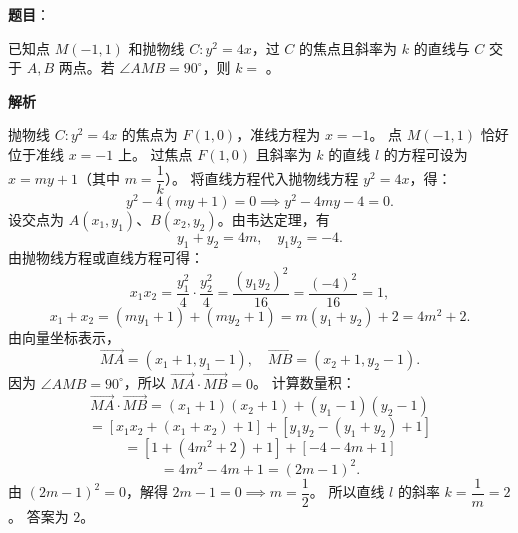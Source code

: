 \begin{answer}

\textbf{题目}：

已知点 $M(-1, 1)$ 和抛物线 $C: y^2 = 4x$，过 $C$ 的焦点且斜率为 $k$ 的直线与 $C$ 交于 $A, B$ 两点。若 $\angle AMB = 90^\circ$，则 $k =$ \underline{\hspace{2cm}}。

\textbf{解析}

抛物线 $C: y^2 = 4x$ 的焦点为 $F(1, 0)$，准线方程为 $x = -1$。
点 $M(-1, 1)$ 恰好位于准线 $x = -1$ 上。
过焦点 $F(1, 0)$ 且斜率为 $k$ 的直线 $l$ 的方程可设为 $x = my + 1$（其中 $m = \dfrac1k$）。
将直线方程代入抛物线方程 $y^2 = 4x$，得：
\nopagebreak[4]
\[y^2 - 4(my + 1) = 0 \implies y^2 - 4my - 4 = 0.\]
设交点为 $A(x_1, y_1)$、$B(x_2, y_2)$。由韦达定理，有
\nopagebreak[4]
\[y_1 + y_2 = 4m, \quad y_1 y_2 = -4.\]
由抛物线方程或直线方程可得：
\nopagebreak[4]
\[x_1 x_2 = \dfrac{y_1^2}{4} \cdot \dfrac{y_2^2}{4} = \dfrac{(y_1 y_2)^2}{16} = \dfrac{(-4)^2}{16} = 1,\]
\nopagebreak[4]
\[x_1 + x_2 = (my_1 + 1) + (my_2 + 1) = m(y_1 + y_2) + 2 = 4m^2 + 2.\]
由向量坐标表示，
\nopagebreak[4]
\[\overrightarrow{MA} = (x_1 + 1, y_1 - 1), \quad \overrightarrow{MB} = (x_2 + 1, y_2 - 1).\]
因为 $\angle AMB = 90^\circ$，所以 $\overrightarrow{MA} \cdot \overrightarrow{MB} = 0$。
计算数量积：
\nopagebreak[4]
\[\overrightarrow{MA} \cdot \overrightarrow{MB} = (x_1 + 1)(x_2 + 1) + (y_1 - 1)(y_2 - 1)\]
\nopagebreak[4]
\[= [x_1 x_2 + (x_1 + x_2) + 1] + [y_1 y_2 - (y_1 + y_2) + 1]\]
\nopagebreak[4]
\[= [1 + (4m^2 + 2) + 1] + [-4 - 4m + 1]\]
\nopagebreak[4]
\[= 4m^2 - 4m + 1 = (2m - 1)^2.\]
由 $(2m - 1)^2 = 0$，解得 $2m - 1 = 0 \implies m = \dfrac12$。
所以直线 $l$ 的斜率 $k = \dfrac1m = 2$。
答案为 $2$。


\par\medskip

\end{answer}

